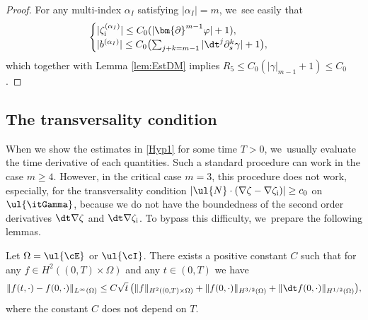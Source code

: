 \begin{proof}
For any multi-index $\alpha_I$ satisfying $|\alpha_I|=m$, we~see easily that
\[
\begin{cases}
|\zeta_\mathrm{i}^{(\alpha_I)}| \leq C_0(|\bm{\partial}^{m-1}\varphi|+1), \\
|b^{(\alpha_I)}| \leq C_0 \bigl(\sum_{j+k=m-1}|\dt^j\partial_s^k\gamma| +1\bigr),
\end{cases}
\]
which together with Lemma \ref{lem:EstDM} implies $R_5 \leq C_0(|\gamma|_{m-1}+1)\leq C_0$.
\end{proof}

\subsection{The transversality condition}\label{secttransv}
When we show the estimates in \eqref{Hyp1} for some time $T>0$, we~usually evaluate the time derivative of each quantities.
Such a standard procedure can work in the case $m\geq4$.
However, in the critical case $m=3$, this procedure does not work, especially, for the transversality condition
\hbox{$|\ul{N}\cdot(\nabla\zeta-\nabla\zeta_\mathrm{i})| \geq c_0$} on $\ul{\itGamma}$,
because we do not have the boundedness of the second order derivatives $\dt\nabla\zeta$ and $\dt\nabla\zeta_\mathrm{i}$.
To bypass this difficulty, we~prepare the following lemmas.

\begin{lemma}\label{lem:Embedding1}
Let $\Omega=\ul{\cE}$ or $\ul{\cI}$.
There exists a positive constant $C$ such that for any $f\in H^2((0,T)\times\Omega)$
and any $t\in(0,T)$ we have
\[
\|f(t,\cdot)-f(0,\cdot)\|_{L^\infty(\Omega)}
\leq C\sqrt{t}\,\bigl(\|f\|_{H^2((0,T)\times\Omega)} + \|f(0,\cdot)\|_{H^{3/2}(\Omega)} + \|\dt f(0,\cdot)\|_{H^{1/2}(\Omega)} \bigr),
\]
where the constant $C$ does not depend on $T$.
\end{lemma}

